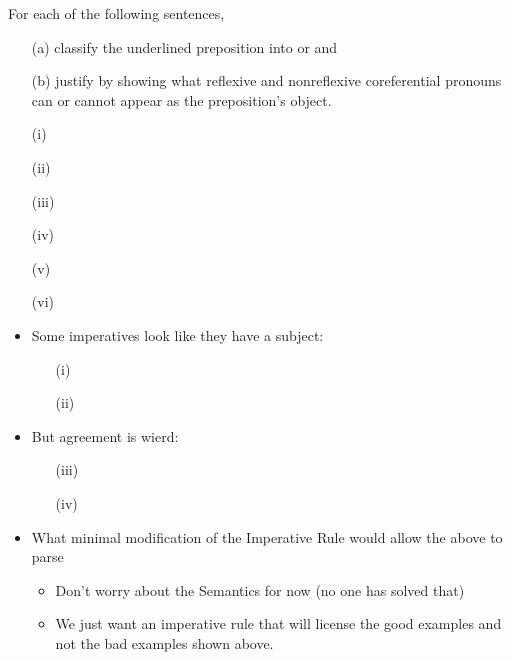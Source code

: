\documentclass[a4paper,landscape,headrule,footrule]{foils}
\begin{document}

For each of the following sentences, 
\begin{itemize}
\item[(a)] classify the underlined preposition into 
  or  and
\item[(b)] justify by showing what reflexive and
  nonreflexive coreferential 
  pronouns can or cannot appear as the preposition's object.
\end{itemize}
\begin{itemize}\addtolength{\itemsep}{-1.5ex}
\item[(i)] 
\item[(ii)] 
\item[(iii)] 
\item[(iv)] 
\item[(v)] 
\item[(vi)] 
\end{itemize}

\begin{itemize}
\item Some imperatives look like they have a subject:
  \begin{itemize}
  \item[(i)] 
  \item[(ii)] 
  \end{itemize}
\item But agreement is wierd:
  \begin{itemize}
  \item[(iii)] 
  \item[(iv)]
  \end{itemize}
\item What minimal modification of the Imperative Rule would allow the above to parse
  \begin{itemize}
  \item Don't worry about the Semantics for now (no one has solved that)
  \item We just want an imperative rule that will license the good examples and not the bad examples shown above.
    
  \end{itemize}


  
\end{itemize}
\end{document}
